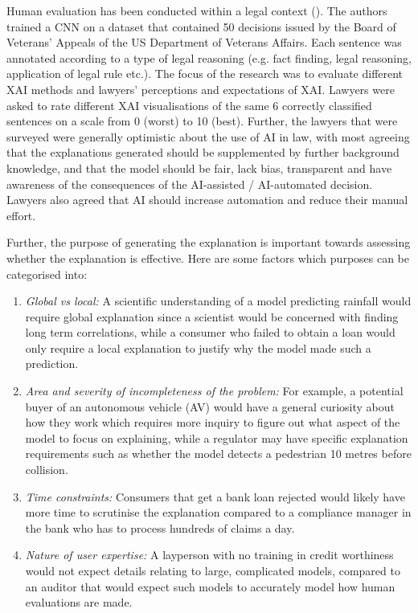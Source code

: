 Human evaluation has been conducted within a legal context (\cite{gorski2021}). The authors trained a CNN on a dataset that contained 50 decisions issued by the Board of Veterans' Appeals of the US Department of Veterans Affairs. Each sentence was annotated according to a type of legal reasoning (e.g. fact finding, legal reasoning, application of legal rule etc.). The focus of the research was to evaluate different XAI methods and lawyers' perceptions and expectations of XAI. Lawyers were asked to rate different XAI visualisations of the same 6 correctly classified sentences on a scale from 0 (worst) to 10 (best). Further, the lawyers that were surveyed were generally optimistic about the use of AI in law, with most agreeing that the explanations generated should be supplemented by further background knowledge, and that the model should be fair, lack bias, transparent and have awareness of the consequences of the AI-assisted / AI-automated decision. Lawyers also agreed that AI should increase automation and reduce their manual effort. 

Further, the purpose of generating the explanation is important towards assessing whether the explanation is effective. Here are some factors which purposes can be categorised into:
\begin{enumerate}
	\item \textit{Global vs local:} A scientific understanding of a model predicting rainfall would require global explanation since a scientist would be concerned with finding long term correlations, while a consumer who failed to obtain a loan would only require a local explanation to justify why the model made such a prediction.
	\item \textit{Area and severity of incompleteness of the problem:} For example, a potential buyer of an autonomous vehicle (AV) would have a general curiosity about how they work which requires more inquiry to figure out what aspect of the model to focus on explaining, while a regulator may have specific explanation requirements such as whether the model detects a pedestrian 10 metres before collision.
	\item \textit{Time constraints:} Consumers that get a bank loan rejected would likely have more time to scrutinise the explanation compared to a compliance manager in the bank who has to process hundreds of claims a day.
	\item \textit{Nature of user expertise:} A layperson with no training in credit worthiness would not expect details relating to large, complicated models, compared to an auditor that would expect such models to accurately model how human evaluations are made.
\end{enumerate}

